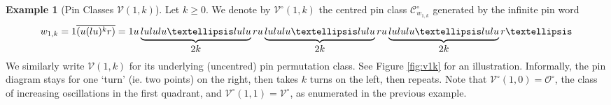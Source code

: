 \documentclass[11pt,a4paper]{article}
\theoremstyle{definition}
\newtheorem{example}[thm]{Example}
\begin{document}
\begin{example}[Pin Classes $\mathcal{V}(1,k)$] \label{v1kcentem}
Let $k \geq 0$. We denote by $\mathcal{V}^{\circ}(1,k)$ the centred pin class $\mathcal{C}^{\circ}_{w_{1,k}}$ generated by the infinite pin word
\[
w_{1,k} = 1\overline{(u(lu)^{k}r)} = 1u\underbrace{\mbox{$lululu\ldots lulu$}}_{\mbox{{\small $2k$}}}ru\underbrace{\mbox{$lululu\ldots lulu$}}_{\mbox{{\small $2k$}}}ru\underbrace{\mbox{$lululu\ldots lulu$}}_{\mbox{{\small $2k$}}}r \dots
\]
We similarly write $\mathcal{V}(1,k)$ for its underlying (uncentred) pin permutation class. See Figure \ref{fig:v1k} for an illustration. Informally, the pin diagram stays for one `turn' (ie. two points) on the right, then takes $k$ turns on the left, then repeats. Note that $\mathcal{V}^{\circ}(1,0) = \mathcal{O}^{\circ}$, the class of increasing oscillations in the first quadrant, and $\mathcal{V}^{\circ}(1,1) = \mathcal{V}^{\circ}$, as enumerated in the previous example.
\end{example}
\end{document}
